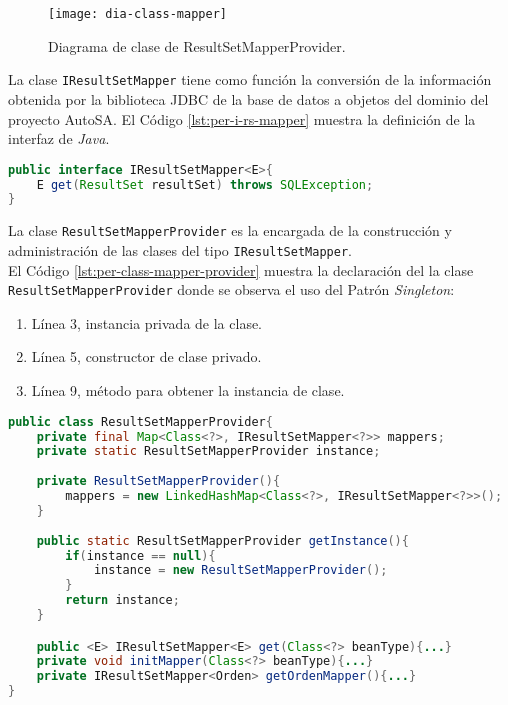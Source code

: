 \begin{figure}[h]
	\centering
	\texttt{[image: dia-class-mapper]}
	\caption{Diagrama de clase de ResultSetMapperProvider.}
	\label{fig:dia-class-mapper}
\end{figure}

La clase \texttt{IResultSetMapper} tiene como función la conversión de la información obtenida por la biblioteca JDBC de la base de datos a objetos del dominio del proyecto AutoSA. El Código \ref{lst:per-i-rs-mapper} muestra la definición de la interfaz de \textit{Java}.
	\begin{lstlisting}[language=Java, caption={Interfaz IResultSetMapper.}, captionpos=b, label={lst:per-i-rs-mapper}]
public interface IResultSetMapper<E>{
	E get(ResultSet resultSet) throws SQLException;
}
	\end{lstlisting}

La clase \texttt{ResultSetMapperProvider} es la encargada de la construcción y administración de las clases del tipo \texttt{IResultSetMapper}.\\
El Código \ref{lst:per-class-mapper-provider} muestra la declaración del la clase \texttt{ResultSetMapperProvider} donde se observa el uso del Patrón \textit{Singleton}:
\begin{enumerate}
	\item Línea 3, instancia privada de la clase.
	\item Línea 5, constructor de clase privado.
	\item Línea 9, método para obtener la instancia de clase.
\end{enumerate}

\begin{lstlisting}[language=Java, caption={Clase ResultSetMapperProvider con Patrón \textit{Singleton}.}, captionpos=b, label={lst:per-class-mapper-provider}]
public class ResultSetMapperProvider{
	private final Map<Class<?>, IResultSetMapper<?>> mappers;
	private static ResultSetMapperProvider instance;
	
	private ResultSetMapperProvider(){
		mappers = new LinkedHashMap<Class<?>, IResultSetMapper<?>>();
	}
	
	public static ResultSetMapperProvider getInstance(){
		if(instance == null){
			instance = new ResultSetMapperProvider();
		}
		return instance;
	}

	public <E> IResultSetMapper<E> get(Class<?> beanType){...}
	private void initMapper(Class<?> beanType){...}
	private IResultSetMapper<Orden> getOrdenMapper(){...}
}
\end{lstlisting}

